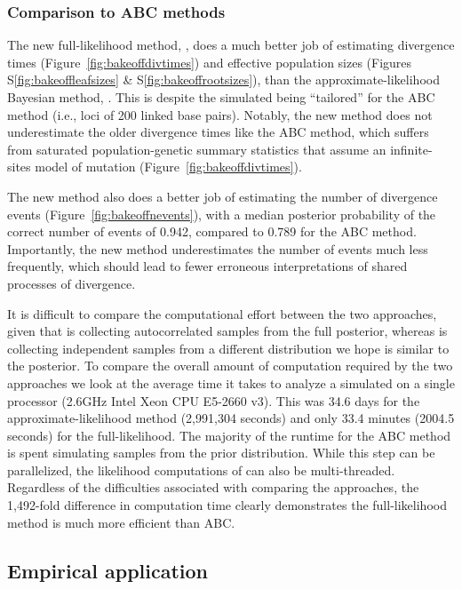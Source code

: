 \subsubsection{Comparison to ABC methods}

The new full-likelihood method, \ecoevolity, does a much better job of
estimating divergence times
(Figure~\ref{fig:bakeoffdivtimes})
and effective population sizes
(Figures
S\ref{fig:bakeoffleafsizes}
\&
S\ref{fig:bakeoffrootsizes}),
than the approximate-likelihood Bayesian method, \dppmsbayes.
This is despite the simulated \datasets being ``tailored'' for the ABC method
(i.e., loci of 200 linked base pairs).
Notably, the new method does not underestimate the older divergence times like
the ABC method, which suffers from saturated population-genetic summary
statistics that assume an infinite-sites model of mutation
(Figure~\ref{fig:bakeoffdivtimes}).

The new method also does a better job of estimating the number of divergence
events (Figure~\ref{fig:bakeoffnevents}), with a median posterior probability
of the correct number of events of 0.942, compared to 0.789 for the ABC method.
Importantly, the new method underestimates the number of events much less
frequently,
which should lead to fewer erroneous interpretations of shared processes of
divergence.

It is difficult to compare the computational effort between the two approaches,
given that \ecoevolity is collecting autocorrelated samples from
the full posterior, whereas \dppmsbayes is collecting independent samples
from a different distribution we hope is similar to the posterior.
To compare the overall amount of computation required by the two approaches
we look at the average time it takes to analyze a simulated \dataset
on a single processor 
(2.6GHz Intel Xeon CPU E5-2660 v3).
This was 34.6 days for the approximate-likelihood method (2,991,304 seconds)
and only 33.4 minutes (2004.5 seconds) for the full-likelihood.
The majority of the runtime for the ABC method is spent simulating samples
from the prior distribution.
While this step can be parallelized, the likelihood computations of \ecoevolity
can also be multi-threaded.
Regardless of the difficulties associated with comparing the approaches, the
1,492-fold difference in computation time clearly demonstrates the
full-likelihood method is much more efficient than ABC.


\subsection{Empirical application}

